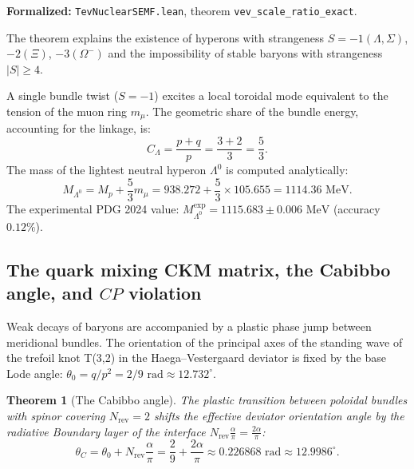 \documentclass[11pt,a4paper]{article}
\newtheorem{theorem}{Theorem}
\theoremstyle{definition}
\theoremstyle{remark}
\begin{document}
\noindent\small\textbf{Formalized:} \texttt{TevNuclearSEMF.lean}, theorem \texttt{vev_scale_ratio_exact}.

The theorem explains the existence of hyperons with strangeness $S = -1 (\Lambda, \Sigma)$, $-2 (\Xi)$, $-3 (\Omega^-)$ and the impossibility of stable baryons with strangeness $|S| \ge 4$.
	
A single bundle twist ($S = -1$) excites a local toroidal mode equivalent to the tension of the muon ring $m_\mu$. The geometric share of the bundle energy, accounting for the linkage, is:
\begin{equation}
	C_\Lambda = \frac{p + q}{p} = \frac{3 + 2}{3} = \frac{5}{3}.
	\label{eq:lambda_hyperon_coeff}
\end{equation}
The mass of the lightest neutral hyperon $\Lambda^0$ is computed analytically:
\begin{equation}
M_{\Lambda^0} = M_p + \frac{5}{3} m_\mu = 938.272 + \frac{5}{3} \times 105.655 = 1114.36\text{ MeV}.
\label{eq:lambda_hyperon_mass_exact}
\end{equation}
The experimental PDG 2024 value: $M_{\Lambda^0}^{\mathrm{exp}} = 1115.683 \pm 0.006\text{ MeV}$ (accuracy $0.12\%$).
	
\subsection{The quark mixing CKM matrix, the Cabibbo angle, and $CP$ violation}
	
Weak decays of baryons are accompanied by a plastic phase jump between meridional bundles. The orientation of the principal axes of the standing wave of the trefoil knot T(3,2) in the Haega--Vestergaard deviator is fixed by the base Lode angle: $\theta_0 = q / p^2 = 2/9\text{ rad} \approx 12.732^\circ$.
	
\begin{theorem}[The Cabibbo angle]
\label{thm:cabibbo_angle_exact}
The plastic transition between poloidal bundles with spinor covering $N_{\mathrm{rev}} = 2$ shifts the effective deviator orientation angle by the radiative Boundary layer of the interface $N_{\mathrm{rev}}\frac{\alpha}{\pi} = \frac{2\alpha}{\pi}$:
\begin{equation}
	\theta_C = \theta_0 + N_{\mathrm{rev}}\frac{\alpha}{\pi} = \frac{2}{9} + \frac{2\alpha}{\pi} \approx 0.226868\text{ rad} \approx 12.9986^\circ.
	\label{eq:cabibbo_angle_exact}
\end{equation}
\end{theorem}
\end{document}
